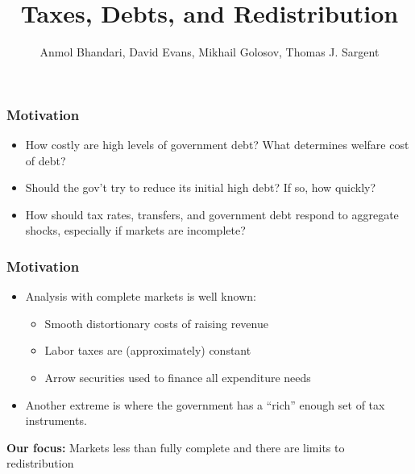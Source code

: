 \documentclass{beamer}
\title {Taxes, Debts,  and Redistribution}
\author{Anmol Bhandari, David Evans, Mikhail Golosov, Thomas J. Sargent}
\begin{document}
%
\begin{frame}
\titlepage

\end{frame}

\begin{frame}
\frametitle{Motivation}

\begin{itemize}
\item How costly are high levels of government debt? What determines welfare cost of debt?
\vspace{2mm}
\item Should the gov't try to reduce its initial high debt? If so, how
quickly?
\vspace{2mm}

\item How should tax rates, transfers, and government debt respond to aggregate shocks, especially if markets are incomplete?
\end{itemize}

\end{frame}

\begin{frame}
\frametitle{Motivation}

\begin{itemize}
\item Analysis with complete markets is well known:

\begin{itemize}
\vspace{2mm}

\item Smooth distortionary costs of raising revenue
\vspace{2mm}

\item Labor taxes are (approximately) constant
\vspace{2mm}

\item  Arrow securities used to finance all expenditure needs
\vspace{2mm}

\end{itemize}
\item Another extreme is where the government has a ``rich'' enough set of tax instruments.
\end{itemize}
\vspace{2mm}

\textbf{Our focus:} Markets less than fully complete and there are limits to redistribution

\end{frame}
\end{document}
